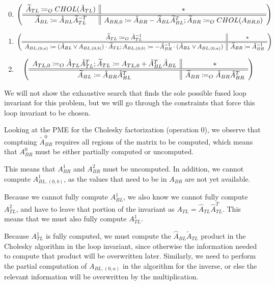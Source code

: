 \documentclass[12pt,letterpaper]{article}
\begin{document}
\begin{enumerate}
\setcounter{enumi}{-1} %
\item
  \begin{equation*}
  \left( \begin{array}{c || c} \widetilde{A}_{TL} \coloneqq_O CHOL(\hat{A}_{TL}) & * \\ \hline \hline \widetilde{A}_{BL} \coloneqq \hat{A}_{BL}\widetilde{A}_{TL}^{-T} & A_{BR, 0} \coloneqq \hat{A}_{BR} - \widetilde{A}_{BL}\widetilde{A}_{BL}^T; \widetilde{A}_{BR} \coloneqq_O CHOL(A_{BR, 0}) \end{array} \right)
  \end{equation*}
\item
  \begin{equation*}
    \left( \begin{array}{c || c} \widetilde{A}_{TL} \coloneqq_O \hat{A}_{TL}^{-1} & * \\ \hline \hline A_{BL, (0, a)} \coloneqq (\hat{A}_{BL} \vee A_{BL, (0, b)}) \cdot \widetilde{A}_{TL}; A_{BL, (0, b)} \coloneqq -\hat{A}_{BR}^{-1} \cdot (\hat{A}_{BL} \vee A_{BL, (0, a)}) & \widetilde{A}_{BR} \coloneqq \hat{A}_{BR}^{-1} \end{array} \right)
  \end{equation*}
\item
  \begin{equation*}
    \left( \begin{array}{c || c} A_{TL, 0} \coloneqq_O \hat{A}_{TL}\hat{A}_{TL}^T; \widetilde{A}_{TL} \coloneqq A_{TL, 0} + \hat{A}_{BL}^T\hat{A}_{BL} & * \\ \hline \hline \widetilde{A}_{BL} \coloneqq \hat{A}_{BR}\hat{A}_{BL}^T & \widetilde{A}_{BR} \coloneqq_O \hat{A}_{BR}\hat{A}_{BR}^T \end{array} \right)
  \end{equation*}
\end{enumerate}

We will not show the exhaustive search that finds the sole possible fused loop invariant for this problem, but we will go through the constraints that force this loop invariant to be chosen.

Looking at the PME for the Cholesky factorization (operation 0), we observe that comptuing $\widetilde{A}^0_{BR}$ requires all regions of the matrix to be computed, which means that $A_{BR}^0$ must be either partially computed or uncomputed.

This means that $A_{BR}^1$ and $A_{BR}^2$ must be uncomputed.
In addition, we cannot compute $A_{BL, (0, b)}^1$, as the values that need to be in $A_{BR}$ are not yet available.

Because we cannot fully compute $A_{BL}^1$, we also know we cannot fully compute $A_{TL}^2$, and have to leave that portion of the invariant as $A_{TL} = \hat{A}_{TL}\hat{A}_{TL}^T$.
This means that we must also fully compute $A_{TL}^1$.

Because $A_{TL}^1$ is fully computed, we must compute the $\hat{A}_{BL}\widetilde{A}_{TL}$ product in the Cholesky algorithm in the loop invariant, since otherwise the information needed to compute that product will be overwritten later.
Similarly, we need to perform the partial computation of $A_{BL, (0, a)}$ in the algorithm for the inverse, or else the relevant information will be overwritten by the multiplication.
\end{document}
